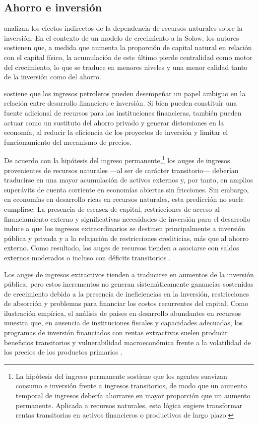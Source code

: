 \documentclass[../../TFM.tex]{subfiles}
\begin{document}
	\subsection{Ahorro e inversión}
	\label{subsec:ahorro-inversion}
	
	\textcite{Gylfason2006} analizan los efectos indirectos de la dependencia de recursos naturales sobre la inversión. En el contexto de un modelo de crecimiento a la Solow, los autores sostienen que, a medida que aumenta la proporción de capital natural en relación con el capital físico, la acumulación de este último pierde centralidad como motor del crecimiento, lo que se traduce en menores niveles y una menor calidad tanto de la inversión como del ahorro.
	
	\textcite{Nili2007} sostiene que los ingresos petroleros pueden desempeñar un papel ambiguo en la relación entre desarrollo financiero e inversión. Si bien pueden constituir una fuente adicional de recursos para las instituciones financieras, también pueden actuar como un sustituto del ahorro privado y generar distorsiones en la economía, al reducir la eficiencia de los proyectos de inversión y limitar el funcionamiento del mecanismo de precios.
	
	De acuerdo con la hipótesis del ingreso permanente,\footnote{La hipótesis del ingreso permanente sostiene que los agentes suavizan consumo e inversión frente a ingresos transitorios, de modo que un aumento temporal de ingresos debería ahorrarse en mayor proporción que un aumento permanente. Aplicada a recursos naturales, esta lógica sugiere transformar rentas transitorias en activos financieros o productivos de largo plazo.} los auges de ingresos provenientes de recursos naturales —al ser de carácter transitorio— deberían traducirse en una mayor acumulación de activos externos y, por tanto, en amplios superávits de cuenta corriente en economías abiertas sin fricciones. Sin embargo, en economías en desarrollo ricas en recursos naturales, esta predicción no suele cumplirse. La presencia de escasez de capital, restricciones de acceso al financiamiento externo y significativas necesidades de inversión para el desarrollo induce a que los ingresos extraordinarios se destinen principalmente a inversión pública y privada y a la relajación de restricciones crediticias, más que al ahorro externo. Como resultado, los auges de recursos tienden a asociarse con saldos externos moderados o incluso con déficits transitorios \parencite{Araujo2016}.
	
	Los auges de ingresos extractivos tienden a traducirse en aumentos de la inversión pública, pero estos incrementos no generan sistemáticamente ganancias sostenidas de crecimiento debido a la presencia de ineficiencias en la inversión, restricciones de absorción y problemas para financiar los costos recurrentes del capital. Como ilustración empírica, el análisis de países en desarrollo abundantes en recursos muestra que, en ausencia de instituciones fiscales y capacidades adecuadas, los programas de inversión financiados con rentas extractivas suelen producir beneficios transitorios y vulnerabilidad macroeconómica frente a la volatilidad de los precios de los productos primarios \parencite{Berg2013}.
	
\end{document}

